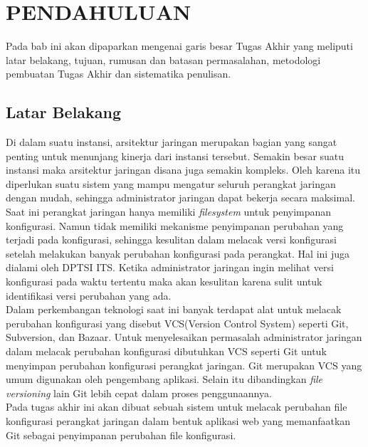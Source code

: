 \chapter{PENDAHULUAN}
	Pada bab ini akan dipaparkan mengenai garis besar Tugas Akhir yang meliputi latar belakang, tujuan, rumusan dan batasan permasalahan, metodologi pembuatan Tugas Akhir dan sistematika penulisan.
        
	\section{Latar Belakang}
		Di dalam suatu instansi, arsitektur jaringan merupakan bagian yang sangat penting untuk menunjang kinerja dari instansi tersebut. Semakin besar suatu instansi maka arsitektur jaringan disana juga semakin kompleks. Oleh karena itu diperlukan suatu sistem yang mampu mengatur seluruh perangkat jaringan dengan mudah, sehingga administrator jaringan dapat bekerja secara maksimal.\\
        \indent Saat ini perangkat jaringan hanya  memiliki \textit{filesystem}  untuk penyimpanan konfigurasi. Namun tidak memiliki mekanisme penyimpanan perubahan yang terjadi pada konfigurasi, sehingga kesulitan dalam melacak versi konfigurasi setelah melakukan banyak perubahan konfigurasi pada perangkat. Hal ini juga dialami oleh DPTSI ITS. Ketika administrator jaringan ingin melihat versi konfigurasi pada waktu tertentu maka akan kesulitan karena sulit untuk identifikasi versi perubahan yang ada.\\
        \indent Dalam perkembangan teknologi saat ini banyak terdapat alat untuk melacak perubahan konfigurasi yang disebut VCS(Version Control System) seperti Git, Subversion, dan Bazaar. Untuk menyelesaikan permasalah administrator jaringan dalam melacak perubahan konfigurasi dibutuhkan VCS seperti Git untuk menyimpan perubahan konfigurasi perangkat jaringan. Git merupakan VCS yang umum digunakan oleh pengembang aplikasi\cite{versioning_popularity}. Selain itu dibandingkan \textit{file versioning} lain Git lebih cepat dalam proses penggunaannya\cite{git_fast}.\\
	    \indent Pada tugas akhir ini akan dibuat sebuah sistem untuk melacak perubahan file konfigurasi perangkat jaringan dalam bentuk aplikasi web  yang memanfaatkan Git sebagai penyimpanan perubahan file konfigurasi. 


